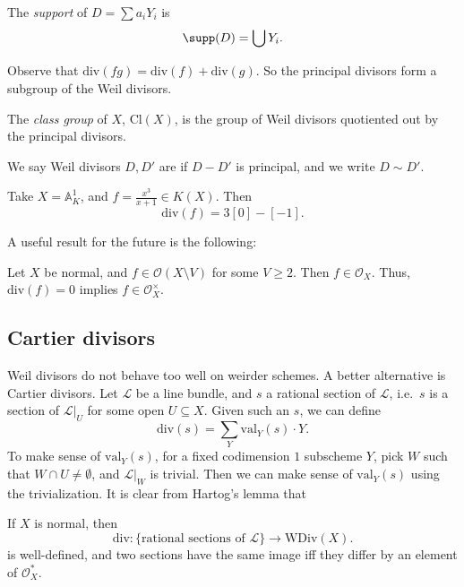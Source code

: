 \documentclass[a4paper]{article}
\newcommand\A{\mathbb{A}}
\newcommand\val{\mathrm{val}}
\renewcommand\div{\mathrm{div}}
\newcommand\Cl{\mathrm{Cl}}
\newcommand\WDiv{\mathrm{WDiv}}
\begin{document}
\begin{defi}[Support]
  The \emph{support} of $D = \sum a_i Y_i$ is
  \[
    \supp(D) = \bigcup Y_i.
  \]
\end{defi}

Observe that $\div(fg) = \div(f) + \div(g)$. So the principal divisors form a subgroup of the Weil divisors.

\begin{defi}
  The \emph{class group} of $X$, $\Cl(X)$, is the group of Weil divisors quotiented out by the principal divisors.

  We say Weil divisors $D, D'$ are  if $D - D'$ is principal, and we write $D \sim D'$.
\end{defi}

\begin{eg}
  Take $X = \A^1_K$, and $f = \frac{x^3}{x + 1} \in K(X)$. Then
  \[
    \div(f) = 3[0] - [-1].
  \]
\end{eg}

A useful result for the future is the following:
\begin{thm}
  Let $X$ be normal, and $f \in \mathcal{O}(X \setminus V)$ for some $V \geq 2$. Then $f \in \mathcal{O}_X$. Thus, $\div(f) = 0$ implies $f \in \mathcal{O}_X^\times$.
\end{thm}

\subsection{Cartier divisors}
Weil divisors do not behave too well on weirder schemes. A better alternative is Cartier divisors. Let $\mathcal{L}$ be a line bundle, and $s$ a rational section of $\mathcal{L}$, i.e.\ $s$ is a section of $\mathcal{L}|_U$ for some open $U \subseteq X$. Given such an $s$, we can define
\[
  \div(s) = \sum_Y \val_Y(s) \cdot Y.
\]
To make sense of $\val_Y(s)$, for a fixed codimension $1$ subscheme $Y$, pick $W$ such that $W \cap U \not= \emptyset$, and $\mathcal{L}|_W$ is trivial. Then we can make sense of $\val_Y(s)$ using the trivialization. It is clear from Hartog's lemma that
\begin{prop}
  If $X$ is normal, then
  \[
    \div: \{\text{rational sections of }\mathcal{L}\} \to \WDiv(X).
  \]
  is well-defined, and two sections have the same image iff they differ by an element of $\mathcal{O}_X^*$.
\end{prop}
\end{document}
